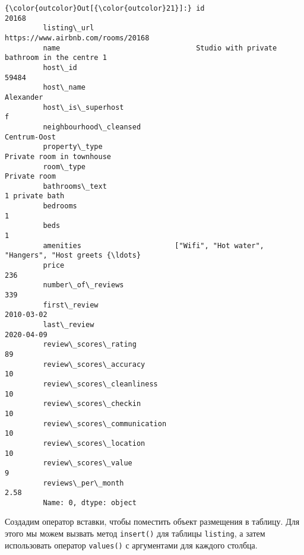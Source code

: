 \documentclass[11pt]{article}
\begin{document}
\begin{Verbatim}[commandchars=\\\{\}]
{\color{outcolor}Out[{\color{outcolor}21}]:} id                                                                         20168
         listing\_url                                   https://www.airbnb.com/rooms/20168
         name                                Studio with private bathroom in the centre 1
         host\_id                                                                    59484
         host\_name                                                              Alexander
         host\_is\_superhost                                                              f
         neighbourhood\_cleansed                                              Centrum-Oost
         property\_type                                          Private room in townhouse
         room\_type                                                           Private room
         bathrooms\_text                                                    1 private bath
         bedrooms                                                                       1
         beds                                                                           1
         amenities                      ["Wifi", "Hot water", "Hangers", "Host greets {\ldots}
         price                                                                        236
         number\_of\_reviews                                                            339
         first\_review                                                          2010-03-02
         last\_review                                                           2020-04-09
         review\_scores\_rating                                                          89
         review\_scores\_accuracy                                                        10
         review\_scores\_cleanliness                                                     10
         review\_scores\_checkin                                                         10
         review\_scores\_communication                                                   10
         review\_scores\_location                                                        10
         review\_scores\_value                                                            9
         reviews\_per\_month                                                           2.58
         Name: 0, dtype: object
\end{Verbatim}
            
    Создадим оператор вставки, чтобы поместить объект размещения в таблицу.
Для этого мы можем вызвать метод \texttt{insert()} для таблицы
\texttt{listing}, а затем использовать оператор \texttt{values()} с
аргументами для каждого столбца.
\end{document}
